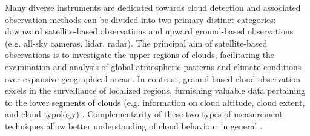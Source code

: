 \documentclass[amt, article]{copernicus}
\begin{document}
Many diverse instruments are dedicated towards cloud detection and associated observation methods can be divided into two primary distinct categories: downward satellite-based observations \citep{roy2017satellite, martin2008satellite} and upward ground-based observations \citep{wilczak1996ground} (e.g. all-sky cameras, lidar, radar). The principal aim of satellite-based observations is to investigate the upper regions of clouds, facilitating the examination and analysis of global atmospheric patterns and climate conditions over expansive geographical areas \citep{schiffer1983international, boers2006satellite, geer2017growing, varnai2018satellite}. In contrast, ground-based cloud observation excels in the surveillance of localized regions, furnishing valuable data pertaining to the lower segments of clouds (e.g. information on cloud altitude, cloud extent, and cloud typology) \citep{bower2000ace, zhou2019cloud}. Complementarity of these two types of measurement techniques allow better understanding of cloud behaviour in general \citep{mokhov1994analysis, schreiner1993comparison, yamashita2012ground, yoshimura2013contribution}.
\end{document}
